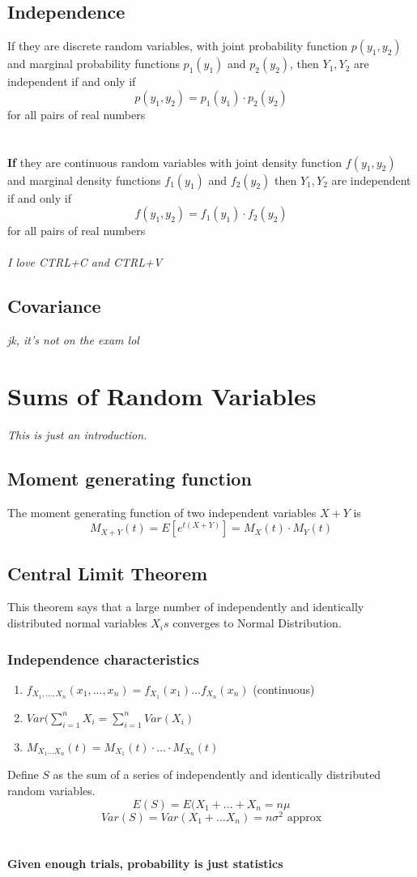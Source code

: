 \documentclass{article}
\begin{document}
\subsection{Independence}
If they are discrete random variables, with joint probability function $p(y_1,y_2)$ and marginal probability functions $p_1(y_1)$ and $p_2(y_2)$, then $Y_1,Y_2$ are independent if and only if 
\[p(y_1,y_2)=p_1(y_1)\cdot p_2(y_2)\]
for all pairs of real numbers
\\\\\\
\textbf{If} they are continuous random variables with joint density function $f(y_1,y_2)$ and marginal density functions $f_1(y_1)$ and $f_2(y_2)$ then $Y_1,Y_2$ are independent if and only if 
\[f(y_1,y_2)=f_1(y_1)\cdot f_2(y_2)\]
for all pairs of real numbers
\\\\
\textit{I love CTRL+C and CTRL+V}
\subsection{Covariance}
\textit{jk, it's not on the exam lol}
\section{Sums of Random Variables}
\textit{This is just an introduction.}
\subsection{Moment generating function}
The moment generating function of two independent variables $X+Y$ is
\[M_{X+Y}(t)=E[e^{t(X+Y)}]=M_X(t)\cdot M_Y(t)\]
\subsection{Central Limit Theorem}
This theorem says that a large number of independently and identically distributed normal variables $X_is$ converges to Normal Distribution.
\subsubsection{Independence characteristics}
\begin{enumerate}
    \item $f_{X_1,...,X_n}(x_1,...,x_n)=f_{X_1}(x_1)...f_{X_n}(x_n)$ (continuous)
    \item $Var(\sum^n_{i=1}X_i=\sum^n_{i=1}Var(X_i)$
    \item $M_{X_1...X_n}(t)=M_{X_1}(t)\cdot...\cdot M_{X_n}(t)$
\end{enumerate}
Define $S$ as the sum of a series of independently and identically distributed random variables.
\[E(S)=E(X_1+...+X_n=n\mu\]
\[Var(S)=Var(X_1+...X_n)=n\sigma^2 \text{ approx}\]
\\\\
\textbf{\Large{Given enough trials, probability is just statistics}}
\end{document}
